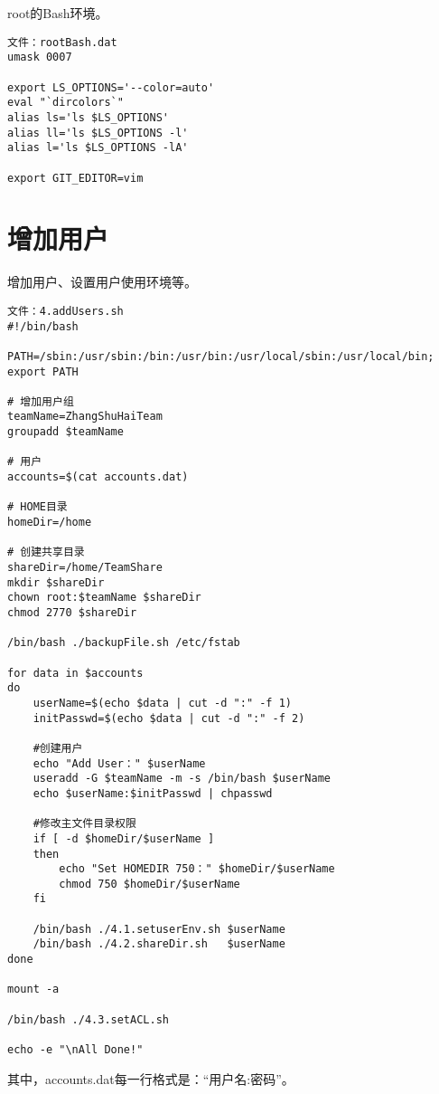 root的Bash环境。
\begin{Verbatim}[]
文件：rootBash.dat
umask 0007

export LS_OPTIONS='--color=auto'
eval "`dircolors`"
alias ls='ls $LS_OPTIONS'
alias ll='ls $LS_OPTIONS -l'
alias l='ls $LS_OPTIONS -lA'

export GIT_EDITOR=vim
\end{Verbatim}


\section{增加用户}

增加用户、设置用户使用环境等。

\begin{Verbatim}[]
文件：4.addUsers.sh
#!/bin/bash

PATH=/sbin:/usr/sbin:/bin:/usr/bin:/usr/local/sbin:/usr/local/bin; export PATH

# 增加用户组
teamName=ZhangShuHaiTeam
groupadd $teamName

# 用户
accounts=$(cat accounts.dat)

# HOME目录
homeDir=/home

# 创建共享目录
shareDir=/home/TeamShare
mkdir $shareDir
chown root:$teamName $shareDir
chmod 2770 $shareDir

/bin/bash ./backupFile.sh /etc/fstab

for data in $accounts
do
	userName=$(echo $data | cut -d ":" -f 1)
	initPasswd=$(echo $data | cut -d ":" -f 2)

	#创建用户
	echo "Add User：" $userName
	useradd -G $teamName -m -s /bin/bash $userName
	echo $userName:$initPasswd | chpasswd

	#修改主文件目录权限
	if [ -d $homeDir/$userName ]
	then
		echo "Set HOMEDIR 750：" $homeDir/$userName
		chmod 750 $homeDir/$userName
	fi

	/bin/bash ./4.1.setuserEnv.sh $userName
	/bin/bash ./4.2.shareDir.sh   $userName
done

mount -a

/bin/bash ./4.3.setACL.sh

echo -e "\nAll Done!"
\end{Verbatim}

其中，accounts.dat每一行格式是：“用户名:密码”。

